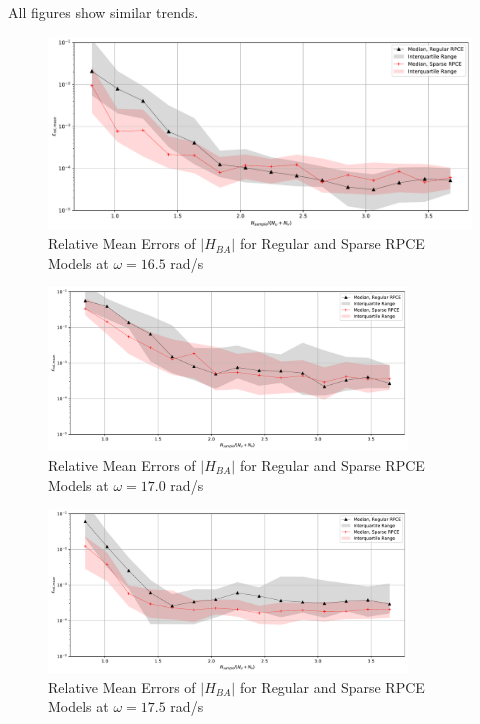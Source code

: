 All figures show similar trends.
\begin{figure}[H]
    \centering
    \includegraphics[width=1.0\textwidth]{
        plots/surrogate/plot_2_B_17.pdf
    }
    \caption{%
        Relative Mean Errors of $\left|H_{BA}\right|$ for Regular and Sparse RPCE Models at $\omega=16.5$ rad/s
    }
    \label{mean_sRPCE_B_A_17}
\end{figure}
\begin{figure}[H]
    \centering
    \includegraphics[width=0.85\textwidth]{
        plots/surrogate/plot_2_B_18.pdf
    }
    \caption{%
        Relative Mean Errors of $\left|H_{BA}\right|$ for Regular and Sparse RPCE Models at $\omega=17.0$ rad/s
    }
\end{figure}
\begin{figure}[H]
    \centering
    \includegraphics[width=0.85\textwidth]{
        plots/surrogate/plot_2_B_19.pdf
    }
    \caption{%
        Relative Mean Errors of $\left|H_{BA}\right|$ for Regular and Sparse RPCE Models at $\omega=17.5$ rad/s
    }
    \label{mean_sRPCE_B_A_19}
\end{figure}
